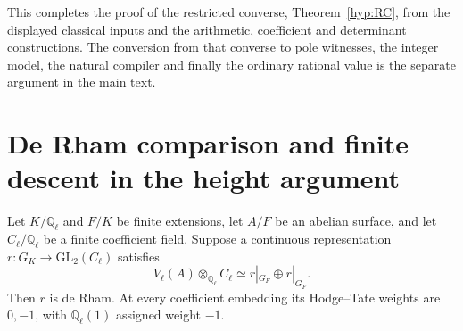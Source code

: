 This completes the proof of the restricted converse,
Theorem~\ref{hyp:RC}, from the displayed classical inputs and
the arithmetic, coefficient and determinant constructions.
The conversion from that converse to pole witnesses, the integer
model, the natural compiler and finally the ordinary rational value
is the separate argument in the main text.



\section{De Rham comparison and finite descent in the height argument}
\label{app:de-rham-descent}

\begin{lemma}\label{lem:de-rham-descent}
Let $K/\mathbb Q_\ell$ and $F/K$ be finite extensions, let $A/F$
be an abelian surface, and let $C_\ell/\mathbb Q_\ell$ be a finite
coefficient field. Suppose a continuous representation
$r:G_K\longrightarrow\mathrm{GL}_2(C_\ell)$ satisfies
\[
 V_\ell(A)\otimes_{\mathbb Q_\ell}C_\ell
       \simeq r|_{G_F}\oplus r|_{G_F}.
\]
Then $r$ is de Rham. At every coefficient embedding its
Hodge--Tate weights are $0,-1$, with
$\mathbb Q_\ell(1)$ assigned weight $-1$.
\end{lemma}

